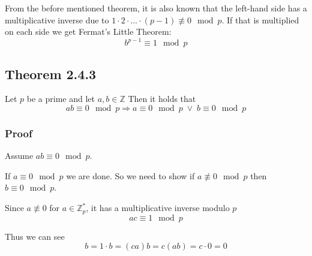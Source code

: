 From the before mentioned theorem, it is also known that the left-hand
side has a multiplicative inverse due to $1 \cdot 2 \cdot \ldots \cdot
(p - 1) \not \equiv 0 \mod p$. If that is multiplied on each side we
get Fermat's Little Theorem:
\[b^{p-1} \equiv 1 \mod p \]

\subsection{Theorem 2.4.3}
Let $p$ be a prime and let $a,b \in \mathbb{Z}$ Then it holds that
\[ ab \equiv 0 \mod p \Rightarrow a \equiv 0 \mod p \; \lor \; b
\equiv 0 \mod p\]

\subsubsection*{Proof}
Assume $ab \equiv 0 \mod p$.

If $a \equiv 0 \mod p$ we are done. So we need to show if $a \not
\equiv 0 \mod p$ then $b \equiv 0 \mod p$.

Since $a \not \equiv 0$ for $a \in \mathbb{Z}_p^*$, it has a
multiplicative inverse modulo $p$
\[ ac \equiv 1 \mod p \]

Thus we can see
\[ b = 1 \cdot b = (ca)b=c(ab) = c \cdot 0 = 0 \]